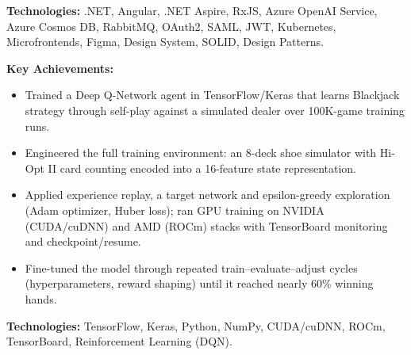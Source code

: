 \documentclass[10pt,a4paper]{altacv}
\begin{document}
\textbf{Technologies:} .NET, Angular, .NET Aspire, RxJS, Azure OpenAI Service, Azure Cosmos DB, RabbitMQ, OAuth2, SAML, JWT, Kubernetes, Microfrontends, Figma, Design System, SOLID, Design Patterns.

\break
\newpage
{}


\textbf{Key Achievements:}
\begin{itemize}
\setlength{\itemindent}{0.5em}
\item[--] Trained a Deep Q-Network agent in TensorFlow/Keras that learns Blackjack strategy through self-play against a simulated dealer over 100K-game training runs.
\item[--] Engineered the full training environment: an 8-deck shoe simulator with Hi-Opt II card counting encoded into a 16-feature state representation.
\item[--] Applied experience replay, a target network and epsilon-greedy exploration (Adam optimizer, Huber loss); ran GPU training on NVIDIA (CUDA/cuDNN) and AMD (ROCm) stacks with TensorBoard monitoring and checkpoint/resume.
\item[--] Fine-tuned the model through repeated train--evaluate--adjust cycles (hyperparameters, reward shaping) until it reached nearly 60\% winning hands.
\end{itemize}

\textbf{Technologies:} TensorFlow, Keras, Python, NumPy, CUDA/cuDNN, ROCm, TensorBoard, Reinforcement Learning (DQN).
\vspace{5mm}

\end{document}
